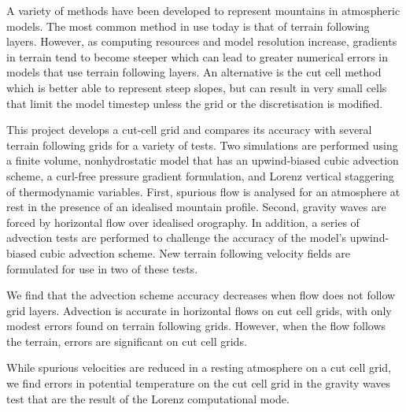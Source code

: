 A variety of methods have been developed to represent mountains in atmospheric models.  The most common method in use today is that of terrain following layers.  However, as computing resources and model resolution increase, gradients in terrain tend to become steeper which can lead to greater numerical errors in models that use terrain following layers.  An alternative is the cut cell method which is better able to represent steep slopes, but can result in very small cells that limit the model timestep unless the grid or the discretisation is modified.

This project develops a cut-cell grid and compares its accuracy with several terrain following grids for a variety of tests.  Two simulations are performed using a finite volume, nonhydrostatic model that has an upwind-biased cubic advection scheme, a curl-free pressure gradient formulation, and Lorenz vertical staggering of thermodynamic variables.  First, spurious flow is analysed for an atmosphere at rest in the presence of an idealised mountain profile.  Second, gravity waves are forced by horizontal flow over idealised orography.  In addition, a series of advection tests are performed to challenge the accuracy of the model's upwind-biased cubic advection scheme.  New terrain following velocity fields are formulated for use in two of these tests.

We find that the advection scheme accuracy decreases when flow does not follow grid layers.  Advection is accurate in horizontal flows on cut cell grids, with only modest errors found on terrain following grids.  However, when the flow follows the terrain, errors are significant on cut cell grids.

While spurious velocities are reduced in a resting atmosphere on a cut cell grid, we find errors in potential temperature on the cut cell grid in the gravity waves test that are the result of the Lorenz computational mode.

